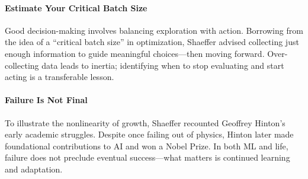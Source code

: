 \paragraph{Estimate Your Critical Batch Size}
Good decision-making involves balancing exploration with action.
Borrowing from the idea of a ``critical batch size'' in optimization, Shaeffer advised collecting just enough information to guide meaningful choices---then moving forward.
Over-collecting data leads to inertia; identifying when to stop evaluating and start acting is a transferable lesson.

\paragraph{Failure Is Not Final}
To illustrate the nonlinearity of growth, Shaeffer recounted Geoffrey Hinton's early academic struggles.
Despite once failing out of physics, Hinton later made foundational contributions to AI and won a Nobel Prize.
In both ML and life, failure does not preclude eventual success---what matters is continued learning and adaptation.
